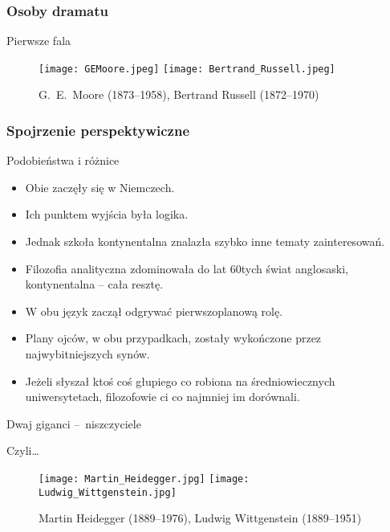 \documentclass{beamer}  %
\begin{document}
\begin{frame}
  \frametitle{Osoby dramatu}

  \begin{block}{Pierwsze fala}
    \begin{figure}
      \centering

      \texttt{[image: GEMoore.jpeg]}
      \texttt{[image: Bertrand\_Russell.jpeg]}
      \caption{G.~E.~Moore (1873--1958), Bertrand Russell
        (1872--1970)}
    \end{figure}
  \end{block}

\end{frame}



\begin{frame}
  \frametitle{Spojrzenie perspektywiczne}

  \begin{block}{Podobieństwa i różnice}
    \begin{itemize}
    \item Obie zaczęły się w Niemczech.
    \item Ich punktem wyjścia była logika.
    \item Jednak szkoła kontynentalna znalazła szybko inne tematy
      zainteresowań.
    \item Filozofia analityczna zdominowała do lat 60\dywiz tych świat
      anglosaski, kontynentalna -- cała resztę.
    \item W obu język zaczął odgrywać pierwszoplanową rolę.
    \item Plany ojców, w obu przypadkach, zostały wykończone przez
      najwybitniejszych synów.
    \item Jeżeli słyszał ktoś coś głupiego co robiona na
      średniowiecznych uniwersytetach, filozofowie ci co najmniej im
      dorównali.
    \end{itemize}
  \end{block}

\end{frame}



\begin{frame}{Dwaj giganci --~niszczyciele}
  \pause

  \begin{block}{Czyli\ldots}
    \begin{figure}
      \centering

      \texttt{[image: Martin\_Heidegger.jpg]}
      \texttt{[image: Ludwig\_Wittgenstein.jpg]} \pause

      \caption{Martin Heidegger (1889--1976), Ludwig Wittgenstein
        (1889--1951)}
    \end{figure}
  \end{block}

\end{frame}
\end{document}
